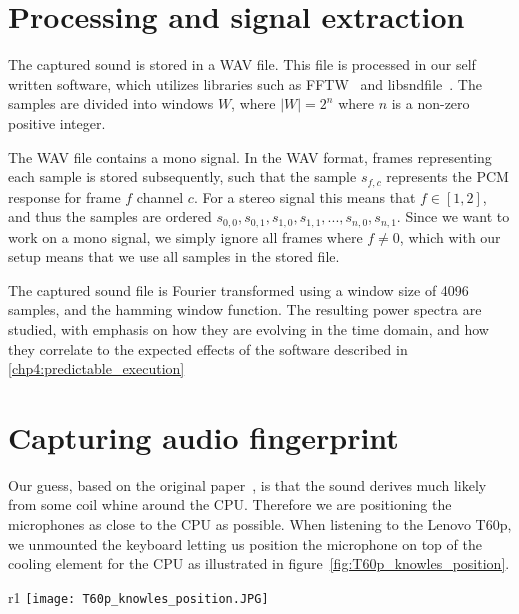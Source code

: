 \section{Processing and signal extraction}\label{ch3:sec:processing_signal_extraction}

The captured sound is stored in a WAV file.
This file is processed in our self written software, which utilizes libraries such as FFTW~\cite{url:fftw} and libsndfile~\cite{url:libsndfile}.
The samples are divided into windows \( W \), where \( \lvert W \rvert = 2^{n} \) where \( n \) is a non-zero positive integer.

The WAV file contains a mono signal. In the WAV format, frames representing each sample is stored subsequently, such that the sample \( s_{f,c} \) represents the \gls{PCM} response for frame \( f \) channel \( c \). 
For a stereo signal this means that \( f \in \left [ 1, 2 \right ]  \), and thus the samples are ordered  \( s_{0,0}, s_{0,1}, s_{1,0}, s_{1,1}, ... , s_{n,0}, s_{n,1} \). 
Since we want to work on a mono signal, we simply ignore all frames where \( f \neq 0 \), which with our setup means that we use all samples in the stored file.

The captured sound file is Fourier transformed using a window size of 4096 samples, and the hamming window function. The resulting power spectra are studied, with emphasis on how they are evolving in the time domain, and how they correlate to the expected effects of the software described in \autoref{chp4:predictable_execution}

\section{Capturing audio fingerprint}\label{ch3:sec:capturing_audio_fingerprint}

Our guess, based on the original paper~\cite{DBLP:conf/crypto/GenkinST14}, is that the sound derives much likely from some coil whine around the CPU. 
Therefore we are positioning the microphones as close to the CPU as possible. 
When listening to the Lenovo T60p, we unmounted the keyboard letting us position the microphone on top of the cooling element for the CPU as illustrated in figure~\ref{fig:T60p_knowles_position}. 

\begin{wrapfigure}{r}{1\textwidth}
  \centering
  \texttt{[image: T60p\_knowles\_position.JPG]}
  \caption{Microphone position while recording the CPU of the Lenovo T60p, using the Knowles Ultrasonic SPU0410LR5H~\cite{url:knowles_spec}.}
  \label{fig:T60p_knowles_position}
\end{wrapfigure}

